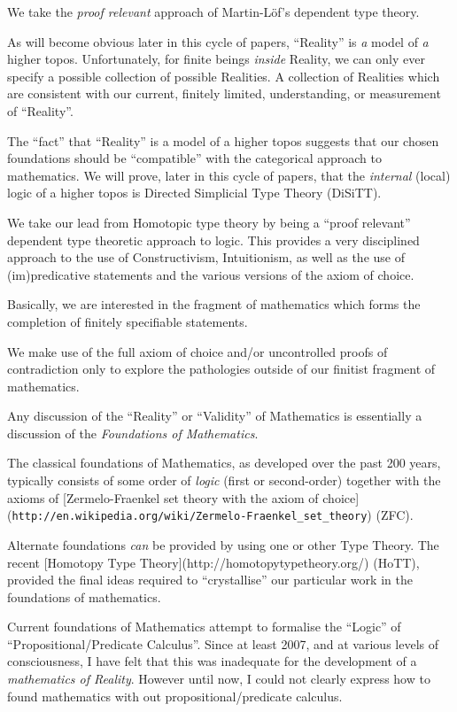 \documentclass[a4paper,openany]{amsbook}
\begin{document}
We take the \emph{proof relevant} approach of Martin-L\"of's dependent 
type theory.

As will become obvious later in this cycle of papers, ``Reality'' is 
\emph{a} model of \emph{a} higher topos.  Unfortunately, for finite 
beings \emph{inside} Reality, we can only ever specify a possible 
collection of possible Realities. A collection of Realities which are 
consistent with our current, finitely limited, understanding, or 
measurement of ``Reality''.

The ``fact'' that ``Reality'' is a model of a higher topos suggests 
that our chosen foundations should be ``compatible'' with the 
categorical approach to mathematics. We will prove, later in this cycle 
of papers, that the \emph{internal} (local) logic of a higher topos is 
Directed Simplicial Type Theory (DiSiTT).

We take our lead from Homotopic type theory by being a ``proof 
relevant'' dependent type theoretic approach to logic. This provides a 
very disciplined approach to the use of Constructivism, Intuitionism, 
as well as the use of (im)predicative statements and the various 
versions of the axiom of choice.

Basically, we are interested in the fragment of mathematics which forms 
the completion of finitely specifiable statements.

We make use of the full axiom of choice and/or uncontrolled proofs of 
contradiction only to explore the pathologies outside of our finitist 
fragment of mathematics.

Any discussion of the ``Reality'' or ``Validity'' of Mathematics is 
essentially a discussion of the \textit{Foundations of Mathematics}.

The classical foundations of Mathematics, as developed over the past 
200 years, typically consists of some order of \emph{logic} (first or 
second-order) together with the axioms of [Zermelo-Fraenkel set theory 
with the axiom of 
choice](\verb|http://en.wikipedia.org/wiki/Zermelo-Fraenkel_set_theory|) 
(ZFC).

Alternate foundations \emph{can} be provided by using one or other Type 
Theory. The recent [Homotopy Type 
Theory](http://homotopytypetheory.org/) (HoTT), provided the final 
ideas required to ``crystallise'' our particular work in the 
foundations of mathematics.

Current foundations of Mathematics attempt to formalise the ``Logic'' 
of ``Propositional/Predicate Calculus''.  Since at least 2007, and at 
various levels of consciousness, I have felt that this was inadequate 
for the development of a \textit{mathematics of Reality}.  However 
until now, I could not clearly express how to found mathematics with 
out propositional/predicate calculus.
\end{document}
